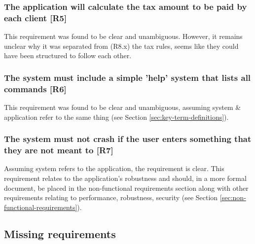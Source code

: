 \subsubsection{The application will calculate the tax amount to be paid by each client [R5]} 
This requirement was found to be clear and unambiguous. 
However, it remains unclear why it was separated from (R8.x) the tax rules, seems like they could have been structured to follow each other. 

\subsubsection{The system must include a simple 'help' system that lists all commands [R6]}

This requirement was found to be clear and unambiguous, assuming system \& application refer to the same thing (see Section \ref{sec:key-term-definitions}). 

\subsubsection{The system must not crash if the user enters something that they are not meant to [R7]}
Assuming system refers to the application, the requirement is clear. 
This requirement relates to the application's robustness and should, in a more formal document, be placed in the non-functional requirements section along with other requirements relating to performance, robustness, security (see Section \ref{sec:non-functional-requirements}).



\subsection{Missing requirements}

